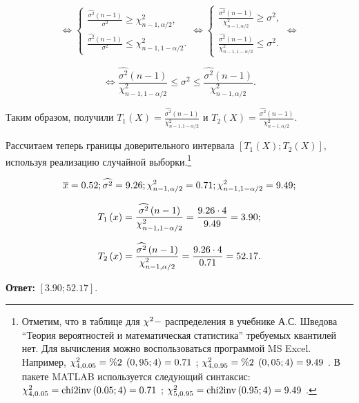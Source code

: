 \[\Leftrightarrow \left\{\begin{array}{l} {\frac{\widehat{\sigma ^{2} }\left(n-1\right)}{\sigma ^{2} } \ge \chi _{n-1,\alpha /2}^{2} ,} \\ {\frac{\widehat{\sigma ^{2} }\left(n-1\right)}{\sigma ^{2} } \le \chi _{n-1,1-\alpha /2}^{2} .} \end{array}\right. \Leftrightarrow \left\{\begin{array}{l} {\frac{\widehat{\sigma ^{2} }\left(n-1\right)}{\chi _{n-1,\alpha /2}^{2} } \ge \sigma ^{2} ,} \\ {\frac{\widehat{\sigma ^{2} }\left(n-1\right)}{\chi _{n-1,1-\alpha /2}^{2} } \le \sigma ^{2} .} \end{array}\right. \Leftrightarrow \] 

\[\Leftrightarrow \frac{\widehat{\sigma ^{2} }\left(n-1\right)}{\chi _{n-1,1-\alpha /2}^{2} } \le \sigma ^{2} \le \frac{\widehat{\sigma ^{2} }\left(n-1\right)}{\chi _{n-1,\alpha /2}^{2} } .\] 

Таким образом, получили $T_{1} \left(X\right)=\frac{\widehat{\sigma ^{2} }\left(n-1\right)}{\chi _{n-1,1-\alpha /2}^{2} } $ и $T_{2} \left(X\right)=\frac{\widehat{\sigma ^{2} }\left(n-1\right)}{\chi _{n-1,\alpha /2}^{2} } $.

Рассчитаем теперь границы доверительного интервала $\left[T_{1} \left(X\right);T_{2} \left(X\right)\right]$, используя реализацию случайной выборки.\footnote{ Отметим, что в таблице для  $\chi ^{2} {\rm -}$ распределения в учебнике А.С. Шведова ``Теория вероятностей и математическая статистика'' требуемых квантилей нет. Для вычисления можно воспользоваться программой MS Excel. Например,  $\chi _{4,0.05}^{2} ={\rm \% 2\; }\left(0,95;4\right)=0.71$ ;  $\chi _{4,0.95}^{2} ={\rm \% 2\; }\left(0,05;4\right)=9.49$ .  В пакете MATLAB используется следующий синтаксис:  $\chi _{4,0.05}^{2} ={\rm chi2inv}\left(0.05;4\right)=0.71$ ;  $\chi _{5,0.95}^{2} ={\rm chi2inv}\left(0.95;4\right)=9.49$ .}

\[\overline{x}=0.52; \widehat{\sigma ^{2} }={\rm 9.26}; \chi _{n-1,\alpha /2}^{2} =0.71; \chi _{n-1,1-\alpha /2}^{2} =9.49;\] 

\[T_{1} \left(x\right)=\frac{\widehat{\sigma ^{2} }\left(n-1\right)}{\chi _{n-1,1-\alpha /2}^{2} } =\frac{{\rm 9.26}\cdot 4}{9.49} =3.90;\] 

\[T_{2} \left(x\right)=\frac{\widehat{\sigma ^{2} }\left(n-1\right)}{\chi _{n-1,\alpha /2}^{2} } =\frac{{\rm 9.26}\cdot 4}{0.71} =52.17.\] 

\textbf{Ответ:} $\left[3.90;52.17\right]$.



